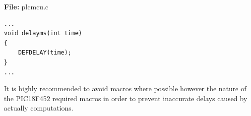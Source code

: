 \textbf{File:} plcmcu.c



\begin{lstlisting}[frame=single]
...
void delayms(int time)
{
	DEFDELAY(time);
}
...
\end{lstlisting}



It is highly recommended to avoid macros where possible however the nature of the PIC18F452 required macros in order to prevent inaccurate delays caused by actually computations.